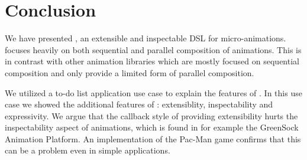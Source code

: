\section{Conclusion}
\label{sec:conclusion}

We have presented \dsl{}, an extensible and inspectable DSL for micro-animations. \dsl{} focuses heavily on both sequential and parallel composition of animations. This is in contrast with other animation libraries which are mostly focused on sequential composition and only provide a limited form of parallel composition.

We utilized a to-do list application use case to explain the features of \dsl{}. In this use case we showed the additional features of \dsl{}: extensiblity, inspectability and expressivity. We argue that the callback style of providing extensibility hurts the inspectability aspect of animations, which is found in for example the GreenSock Animation Platform. An implementation of the Pac-Man game confirms that this can be a problem even in simple applications.

